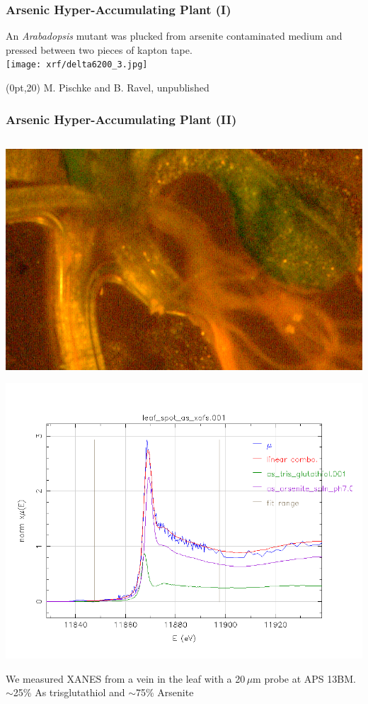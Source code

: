 \documentclass[10pt, xcolor=x11names, compress]{beamer}
\begin{document}
\begin{frame}
  \frametitle{Arsenic Hyper-Accumulating Plant (I)}

  \begin{center}
    An \textit{Arabadopsis} mutant was plucked from arsenite
    contaminated medium and pressed between two pieces of kapton
    tape.\\[1ex]
    \texttt{[image: xrf/delta6200\_3.jpg]}
  \end{center}
  \begin{textblock*}{0.5\linewidth}(0pt,20\TPVertModule)
    \tiny M. Pischke and B. Ravel, unpublished
  \end{textblock*}
\end{frame}
\begin{frame}
  \frametitle{Arsenic Hyper-Accumulating Plant (II)}

  \begin{columns}[T]
    \begin{column}{0.6\linewidth}
      \qquad\includegraphics[width=0.65\linewidth]{xrf/arabadopsis_sm.png}

      \quad\includegraphics[width=0.7\linewidth]{xrf/arabadopsis_xanes.png}

      \small We measured XANES from a vein in the leaf with a
      20\,$\mu$m probe at APS 13BM.\\
      {\color{Green4}$\sim$25\% As trisglutathiol} and
      {\color{Purple4}$\sim$75\% Arsenite}


\end{column}
\end{columns}
\end{frame}
\end{document}
